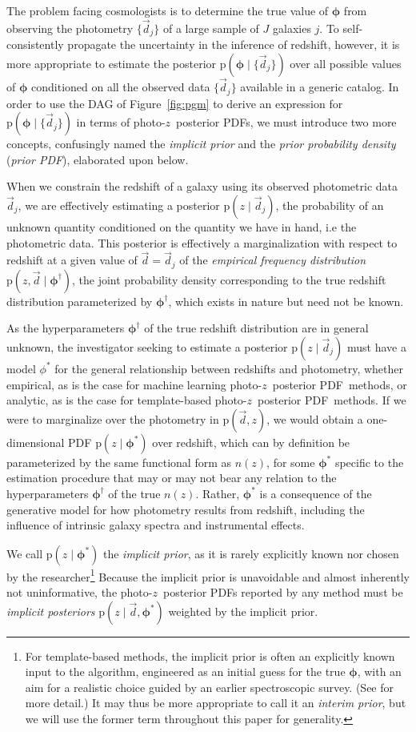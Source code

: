 \documentclass[iop]{emulateapj}
\newcommand{\todo}[3]{{\color{#2}\emph{#1}: #3}}
\newcommand{\que}[1]{\todo{Question}{cyan}{#1}}
\newcommand{\Fig}[1]{Figure~\ref{#1}}
\newcommand{\data}{\ensuremath{\vec{d}}}%
\newcommand{\pr}[1]{\ensuremath{\mathrm{p}(#1)}}%
\newcommand{\gvn}{\mid}%
\newcommand{\pz}{photo-$z$}
\newcommand{\pzpdf}{\pz\ posterior PDF}%
\newcommand{\nz}{$n(z)$}
\newcommand{\bvec}[1]{\ensuremath{\boldsymbol{#1}}}%
\newcommand{\ndphi}{\bvec{\phi}}
\begin{document}
The problem facing cosmologists is to determine the true value of $\ndphi$ from observing the photometry $\{\data_{j}\}$ of a large sample of $J$ galaxies $j$.
To self-consistently propagate the uncertainty in the inference of redshift, however, it is more appropriate to estimate the posterior $\pr{\ndphi \gvn \{\data_{j}\}}$ over all possible values of $\ndphi$ conditioned on all the observed data $\{\data_{j}\}$ available in a generic catalog.
In order to use the DAG of \Fig{fig:pgm} to derive an expression for $\pr{\ndphi \gvn \{\data_{j}\}}$ in terms of \pzpdf s, we must introduce two more concepts, confusingly named the \textit{implicit prior} and the \textit{prior probability density} (\textit{prior PDF}), elaborated upon below.

When we constrain the redshift of a galaxy using its observed photometric data $\data_{j}$, we are effectively estimating a posterior $\pr{z \gvn \data_{j}}$, the probability of an unknown quantity conditioned on the quantity we have in hand, i.e the photometric data.
This posterior is effectively a marginalization with respect to redshift at a given value of $\data = \data_{j}$ of the \textit{empirical frequency distribution} $\pr{z, \data \gvn \ndphi^{\dagger}}$, the joint probability density corresponding to the true redshift distribution parameterized by $\ndphi^{\dagger}$, which exists in nature but need not be known.

As the hyperparameters $\ndphi^{\dagger}$ of the true redshift distribution are in general unknown, the investigator seeking to estimate a posterior $\pr{z \gvn \data_{j}}$ must have a model $\phi^{*}$ for the general relationship between redshifts and photometry, whether empirical, as is the case for machine learning \pzpdf\ methods, or analytic, as is the case for template-based \pzpdf\ methods.
If we were to marginalize over the photometry in $\pr{\data, z}$, we would obtain a one-dimensional PDF $\pr{z \gvn \ndphi^{*}}$ over redshift, which can by definition be parameterized by the same functional form as \nz, for some $\ndphi^{*}$ specific to the estimation procedure that may or may not bear any relation to the hyperparameters $\ndphi^{\dagger}$ of the true \nz.
Rather, $\ndphi^{*}$ is a consequence of the generative model for how photometry results from redshift, including the influence of intrinsic galaxy spectra and instrumental effects.

We call $\pr{z \gvn \ndphi^{*}}$ the \textit{implicit prior}, as it is rarely explicitly known nor chosen by the researcher\footnote{For template-based methods, the implicit prior is often an explicitly known input to the algorithm, engineered as an initial guess for the true $\ndphi$, with an aim for a realistic choice guided by an earlier spectroscopic survey.
(See \citet{benitez_bayesian_2000} for more detail.)
It may thus be more appropriate to call it an \textit{interim prior}, but we will use the former term throughout this paper for generality.}
Because the implicit prior is unavoidable and almost inherently not uninformative, the \pzpdf s reported by any method must be \textit{implicit posteriors} ${\pr{z \gvn \data, \ndphi^{*}}}$ weighted by the implicit prior.
\end{document}
